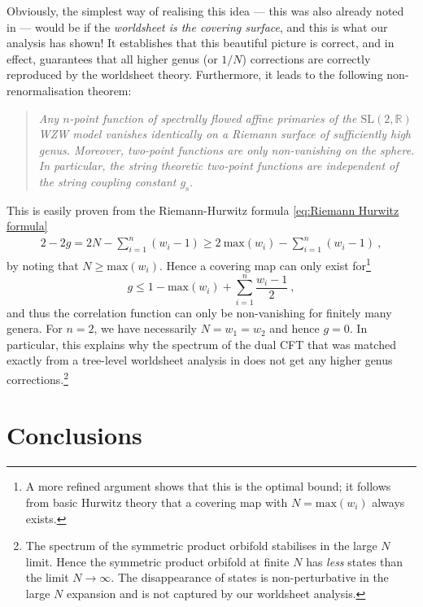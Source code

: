 \documentclass[12pt,a4paper]{article}
\newcommand{\be}{\begin{equation}}
\newcommand{\ee}{\end{equation}}
\begin{document}
Obviously, the simplest way of realising this idea --- this was also already noted in \cite{Lunin:2000yv,Pakman:2009zz} --- would be if the {\it 
worldsheet is the covering surface}, and this is what our analysis has shown! It establishes that this beautiful picture is correct, and in effect, guarantees that all higher genus (or $1/N$) corrections are correctly reproduced by the worldsheet theory. Furthermore, it leads to the following non-re\-nor\-ma\-li\-sation theorem:
\begin{verse} 
\hspace{0.5cm} \textit{Any $n$-point function of spectrally flowed affine primaries of the \linebreak $\mathrm{SL}(2,\mathds{R})$ WZW model vanishes identically on a Riemann surface of sufficiently high genus. Moreover, two-point functions are only non-vanishing on the sphere. In particular, the string theoretic two-point functions are independent of the string coupling constant $g_\mathrm{s}$.}
\end{verse}

\noindent 
This is easily proven from the Riemann-Hurwitz formula \eqref{eq:Riemann Hurwitz formula}
\begin{align}\label{RHp}
2-2g=2N-\sum_{i=1}^n (w_i-1) \ge 2 \ \text{max}(w_i)-\sum_{i=1}^n(w_i-1)\ ,
\end{align}
by noting that $N\geq \text{max}(w_i)$. Hence a covering map can only exist for\footnote{A more refined argument shows that this is the optimal bound; it follows from basic Hurwitz theory that a covering map with $N=\text{max}(w_i)$ always exists.}
\be 
g \le 1-\text{max}(w_i)+\sum_{i=1}^n \frac{w_i-1}{2}\ ,\label{eq:genus inequality}
\ee
and thus the correlation function can only be non-vanishing for finitely many genera. For $n=2$, we have necessarily $N=w_1=w_2$ and hence $g=0$. In particular, this explains why the spectrum of the dual CFT that was matched exactly from a tree-level worldsheet analysis in \cite{Eberhardt:2018ouy} does not get any higher genus corrections.\footnote{The spectrum of the symmetric product orbifold stabilises in the large $N$ limit. Hence the symmetric product orbifold at finite $N$ has \emph{less} states than the limit $N \to \infty$. The disappearance of states is non-perturbative in the large $N$ expansion and is not captured by our worldsheet analysis.}  



\section{Conclusions}\label{sec:concl}
\end{document}
